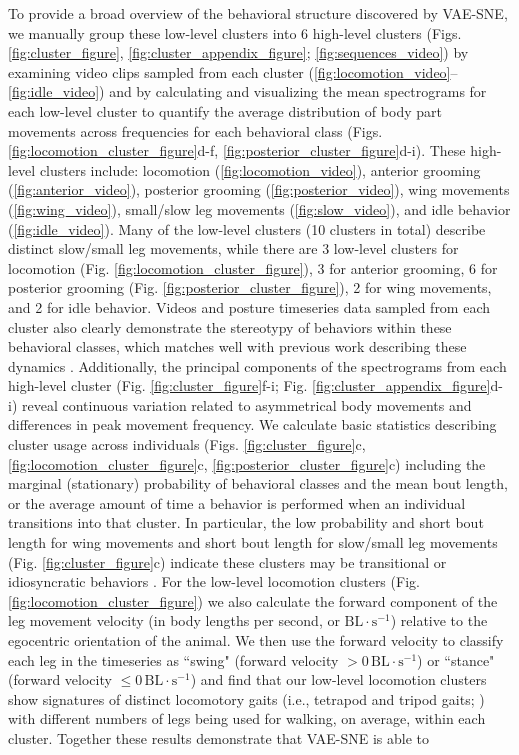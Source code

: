 \documentclass[11pt,a4paper,oneside]{book}
\begin{document}
To provide a broad overview of the behavioral structure discovered by VAE-SNE, we manually group these low-level clusters into 6 high-level clusters (Figs. \ref{fig:cluster_figure}, \ref{fig:cluster_appendix_figure}; \ref{fig:sequences_video}) by examining video clips sampled from each cluster (\ref{fig:locomotion_video}--\ref{fig:idle_video}) and by calculating and visualizing the mean spectrograms for each low-level cluster to quantify the average distribution of body part movements across frequencies for each behavioral class (Figs. \ref{fig:locomotion_cluster_figure}d-f, \ref{fig:posterior_cluster_figure}d-i). These high-level clusters include: locomotion (\ref{fig:locomotion_video}), anterior grooming (\ref{fig:anterior_video}), posterior grooming (\ref{fig:posterior_video}), wing movements (\ref{fig:wing_video}), small/slow leg movements (\ref{fig:slow_video}), and idle behavior (\ref{fig:idle_video}). Many of the low-level clusters (10 clusters in total) describe distinct slow/small leg movements, while there are 3 low-level clusters for locomotion (Fig. \ref{fig:locomotion_cluster_figure}), 3 for anterior grooming, 6 for posterior grooming (Fig. \ref{fig:posterior_cluster_figure}), 2 for wing movements, and 2 for idle behavior. Videos and posture timeseries data sampled from each cluster also clearly demonstrate the stereotypy of behaviors within these behavioral classes, which matches well with previous work describing these dynamics \citep{berman2014mapping, berman2016predictability, klibaite2017unsupervised, klibaite2019interacting, pereira2019fast}. Additionally, the principal components of the spectrograms from each high-level cluster (Fig. \ref{fig:cluster_figure}f-i; Fig. \ref{fig:cluster_appendix_figure}d-i) reveal continuous variation related to asymmetrical body movements and differences in peak movement frequency. We calculate basic statistics describing cluster usage across individuals (Figs. \ref{fig:cluster_figure}c, \ref{fig:locomotion_cluster_figure}c, \ref{fig:posterior_cluster_figure}c) including the marginal (stationary) probability of behavioral classes and the mean bout length, or the average amount of time a behavior is performed when an individual transitions into that cluster. In particular, the low probability and short bout length for wing movements and short bout length for slow/small leg movements (Fig. \ref{fig:cluster_figure}c) indicate these clusters may be transitional or idiosyncratic behaviors \citep{todd2017systematic}. For the low-level locomotion clusters (Fig. \ref{fig:locomotion_cluster_figure}) we also calculate the forward component of the leg movement velocity (in body lengths per second, or $\textrm{BL} \cdot \textrm{s}^{-1}$) relative to the egocentric orientation of the animal. We then use the forward velocity to classify each leg in the timeseries as ``swing" (forward velocity $> 0 \, \textrm{BL} \cdot \textrm{s}^{-1}$) or ``stance" (forward velocity $\leq 0 \, \textrm{BL} \cdot \textrm{s}^{-1}$) and find that our low-level locomotion clusters show signatures of distinct locomotory gaits (i.e., tetrapod and tripod gaits; \citealt{mendes2013quantification, pereira2019fast}) with different numbers of legs being used for walking, on average, within each cluster. Together these results demonstrate that VAE-SNE is able to 
\end{document}
